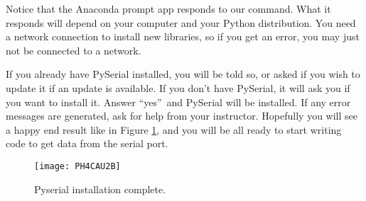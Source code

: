 Notice that the Anaconda prompt app responds to our command. What it
responds will depend on your computer and your Python distribution. You need
a network connection to install new libraries, so if you get an error, you
may just not be connected to a network.

If you already have PySerial
installed, you will be told so, or asked if you wish to update it if an
update is available. If you don't have PySerial, it will ask you if you want
to install it. Answer \textquotedblleft yes\textquotedblright\ and PySerial
will be installed. If any error messages are generated, ask for help from
your instructor. Hopefully you will see a happy end result like in
Figure \ref{fig:pyserial_finished},
and you will be all ready to start writing code to get data from the serial
port.
\begin{figure}[htbp!]
    \centering
\texttt{[image: PH4CAU2B]}
    \caption[Pyserial installation complete]{Pyserial installation complete.}
    \label{fig:pyserial_finished}
\end{figure}%

